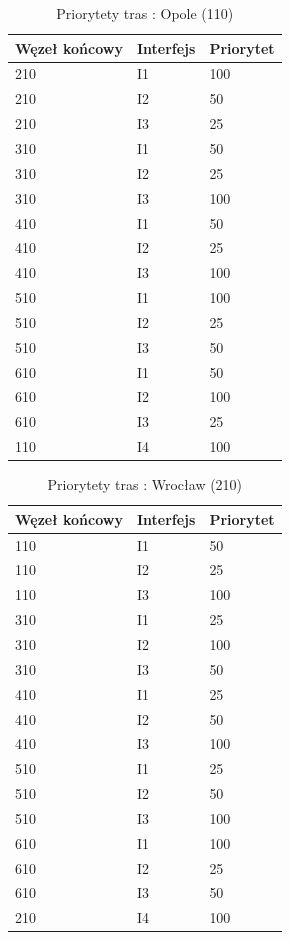 \documentclass[a4paper]{article}
\begin{document}
\begin{table}[H]
	\centering
	\caption{Priorytety tras : Opole (110)}
	\label{xxx}
	\begin{tabular}{lll}
		\hline
		Węzeł końcowy & Interfejs & Priorytet \\
        \hline
		210 & I1 & 100 \\
		210 & I2 & 50 \\
        210 & I3 & 25 \\       
        \hline
		310 & I1 & 50 \\
		310 & I2 & 25 \\
        310 & I3 & 100 \\
        \hline
		410 & I1 & 50 \\
		410 & I2 & 25 \\
		410 & I3 & 100 \\        
        \hline
		510 & I1 & 100 \\
		510 & I2 & 25 \\
		510 & I3 & 50 \\
        \hline
		610 & I1 & 50 \\
		610 & I2 & 100 \\
		610 & I3 & 25 \\
        \hline
		110 & I4 & 100 \\
	\end{tabular}
\end{table}

\begin{table}[H]
	\centering
	\caption{Priorytety tras : Wrocław (210)}
	\label{xxx}
	\begin{tabular}{lll}
		\hline
		Węzeł końcowy & Interfejs & Priorytet \\
        \hline
		110 & I1 & 50 \\
		110 & I2 & 25 \\
		110 & I3 & 100 \\        
        \hline
		310 & I1 & 25 \\
		310 & I2 & 100 \\
		310 & I3 & 50 \\
        \hline
		410 & I1 & 25 \\
		410 & I2 & 50 \\
		410 & I3 & 100 \\       
        \hline
		510 & I1 & 25 \\
		510 & I2 & 50 \\
		510 & I3 & 100 \\
        \hline
		610 & I1 & 100 \\
		610 & I2 & 25 \\
		610 & I3 & 50 \\
        \hline
		210 & I4 & 100 \\
	\end{tabular}
\end{table}
\end{document}
